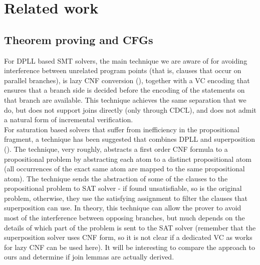 \section{Related work}
\subsection{Theorem proving and CFGs}
For DPLL based SMT solvers, the main technique we are aware of for avoiding interference between unrelated program points (that is, clauses that occur on parallel branches), is lazy CNF conversion (\cite{DBLP:conf/cav/BarrettDS02}), together with a VC encoding that ensures that a branch side is decided before the encoding of the statements on that branch are available. This technique achieves the same separation that we do, but does not support joins directly (only through CDCL), and does not admit a natural form of incremental verification. \\
For saturation based solvers that suffer from inefficiency in the propositional fragment, a technique has been suggested that combines DPLL and superposition (\cite{Voronkov14}). 
The technique, very roughly, abstracts a first order CNF formula to a propositional problem by abstracting each atom to a distinct propositional atom (all occurrences of the exact same atom are mapped to the same propositional atom). 
The technique sends the abstraction of some of the clauses to the propositional problem to SAT solver -  if found unsatisfiable, so is the original problem, otherwise, they use the satisfying assignment to filter the clauses that superposition can use. 
In theory, this technique can allow the prover to avoid most of the interference between opposing branches, 
but much depends on the details of which part of the problem is sent to the SAT solver (remember that the superposition solver uses CNF form, so it is not clear if a dedicated VC as works for lazy CNF can be used here). It will be interesting to compare the approach to ours and determine if join lemmas are actually derived.


